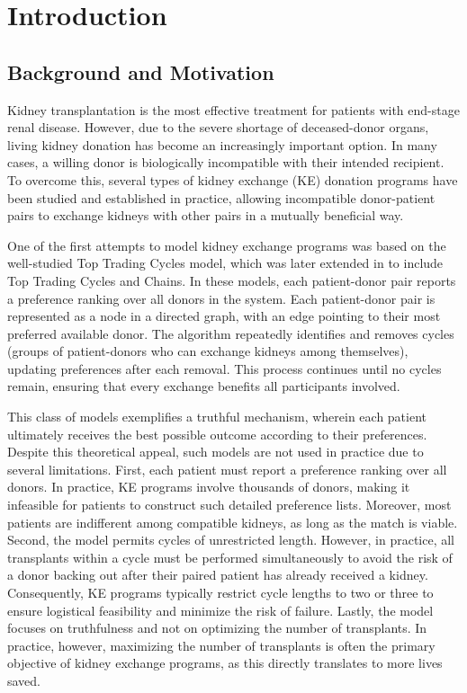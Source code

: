 \chapter{Introduction}
\label{cha:introduction}


\section{Background and Motivation}
\label{sec:background_and_motivation}

Kidney transplantation is the most effective treatment for patients with end-stage renal disease. However, due to the severe shortage of deceased-donor organs, living kidney donation has become an increasingly important option. In many cases, a willing donor is biologically incompatible with their intended recipient. To overcome this, several types of kidney exchange (KE) donation programs have been studied and established in practice, allowing incompatible donor-patient pairs to exchange kidneys with other pairs in a mutually beneficial way.

One of the first attempts to model kidney exchange programs was based on the well-studied Top Trading Cycles model, which was later extended in \cite{roth2004kidney} to include Top Trading Cycles and Chains. In these models, each patient-donor pair reports a preference ranking over all donors in the system. Each patient-donor pair is represented as a node in a directed graph, with an edge pointing to their most preferred available donor. The algorithm repeatedly identifies and removes cycles (groups of patient-donors who can exchange kidneys among themselves), updating preferences after each removal. This process continues until no cycles remain, ensuring that every exchange benefits all participants involved.

This class of models exemplifies a truthful mechanism, wherein each patient ultimately receives the best possible outcome according to their preferences. Despite this theoretical appeal, such models are not used in practice due to several limitations. First, each patient must report a preference ranking over all donors. In practice, KE programs involve thousands of donors, making it infeasible for patients to construct such detailed preference lists. Moreover, most patients are indifferent among compatible kidneys, as long as the match is viable. Second, the model permits cycles of unrestricted length. However, in practice, all transplants within a cycle must be performed simultaneously to avoid the risk of a donor backing out after their paired patient has already received a kidney. Consequently, KE programs typically restrict cycle lengths to two or three to ensure logistical feasibility and minimize the risk of failure. Lastly, the model focuses on truthfulness and not on optimizing the number of transplants. In practice, however, maximizing the number of transplants is often the primary objective of kidney exchange programs, as this directly translates to more lives saved.

